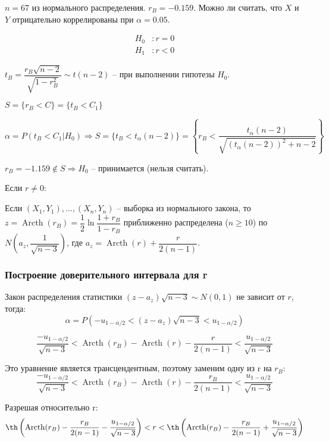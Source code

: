 \begin{ex}
  $n=67$ из нормального распределения. $r_B = -0.159$. Можно ли считать, что $X$ и $Y$ отрицательно коррелированы при $\alpha = 0.05$.

  \begin{align*}
    H_0 &: r = 0 \\
    H_1 &: r < 0
  \end{align*}

  $t_B = \dfrac{r_B \sqrt{n-2}}{\sqrt{1-r_B^2}} \sim t(n-2)$ -- при выполнении гипотезы $H_0$.

  $S = \{r_B < C\} = \{ t_B < C_1\}$

  \[
    \alpha = P(t_B < C_1 | H_0) \Rightarrow S = \{ t_B < t_\alpha (n-2) \} = 
    \left\{ r_B < \dfrac{t_\alpha (n-2)}{\sqrt{ (t_\alpha(n-2))^2 + n-2 }}\right\}
  \]

  $r_B = -1.159 \notin S \Rightarrow H_0$ -- принимается (нельзя считать). 
\end{ex}

Если $r \neq 0$:
\begin{theorem}[Фишера]
  Если $(X_1, Y_1), \dots, (X_n, Y_n)$ -- выборка из нормального закона, то
  $z = \operatorname{Arcth} (r_B) = \dfrac{1}{2} \ln \dfrac{1 + r_B}{1 - r_B}$
  приближенно распределена ($n \geqslant 10$) по
  $N\left(a_z, \dfrac{1}{\sqrt{n-3}}\right)$, где
  $a_z = \operatorname{Arcth} (r) + \dfrac{r}{2(n-1)}$.
\end{theorem}

\subsubsection{Построение доверительного интервала для r}

Закон распределения статистики $(z-a_z) \sqrt{n-3} \sim N(0, 1)$ не зависит от $r$, тогда:
\[
  \alpha = P(-u_{1-\alpha/2} < (z-a_z) \sqrt{n-3} < u_{1 - \alpha/2})
\]

\[
  \dfrac{-u_{1-\alpha/2}}{\sqrt{n-3}} < \operatorname{Arcth} (r_B) - \operatorname{Arcth} (r) - \dfrac{r}{2(n-1)} < \dfrac{u_{1-\alpha/2}}{\sqrt{n-3}}
\]

Это уравнение является трансцендентным, поэтому заменим одну из r на $r_B$:
\[
  \dfrac{-u_{1-\alpha/2}}{\sqrt{n-3}} < \operatorname{Arcth} (r_B) - \operatorname{Arcth} (r) - \dfrac{r_B}{2(n-1)} < \dfrac{u_{1-\alpha/2}}{\sqrt{n-3}}
\]

Разрешая относительно r:
\[
  \th \left( \operatorname{Arcth}(r_B) - \dfrac{r_B}{2(n-1)} - \dfrac{u_{1-\alpha/2}}{\sqrt{n-3}} \right)
  < r
  < \th \left( \operatorname{Arcth}(r_B) - \dfrac{r_B}{2(n-1)} + \dfrac{u_{1-\alpha/2}}{\sqrt{n-3}} \right)
\]

